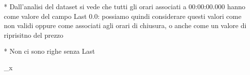 * Dall'analisi del dataset si vede che tutti gli orari associati a 00:00:00.000 hanno come valore del campo Last 0.0: possiamo quindi considerare questi valori come non validi oppure come associati agli orari di chiusura, o anche come un valore di riprisitno del prezzo

* Non ci sono righe senza Last


\lim_{x \to \infty}  

\binom{}{} 